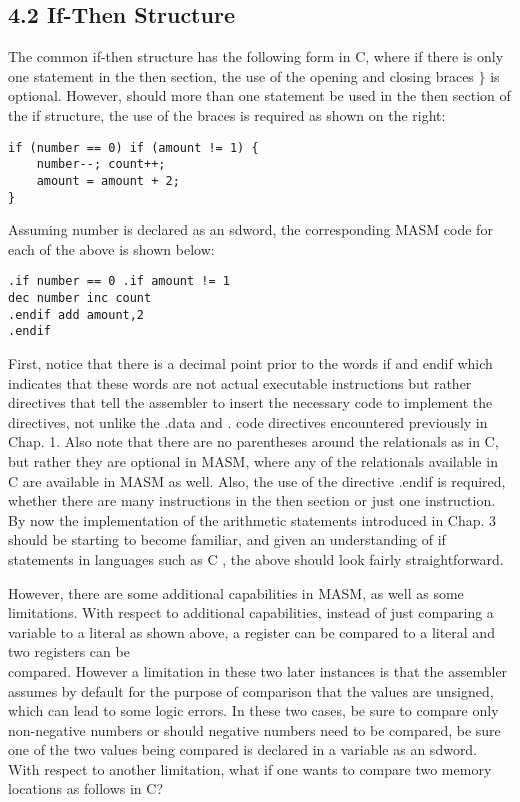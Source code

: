 \documentclass[10pt]{article}
\begin{document}
\subsection*{4.2 If-Then Structure}
The common if-then structure has the following form in C, where if there is only one statement in the then section, the use of the opening and closing braces $\}$ is optional. However, should more than one statement be used in the then section of the if structure, the use of the braces is required as shown on the right:

\begin{verbatim}
if (number == 0) if (amount != 1) {
    number--; count++;
    amount = amount + 2;
}
\end{verbatim}

Assuming number is declared as an sdword, the corresponding MASM code for each of the above is shown below:

\begin{verbatim}
.if number == 0 .if amount != 1
dec number inc count
.endif add amount,2
.endif
\end{verbatim}

First, notice that there is a decimal point prior to the words if and endif which indicates that these words are not actual executable instructions but rather directives that tell the assembler to insert the necessary code to implement the directives, not unlike the .data and . code directives encountered previously in Chap. 1. Also note that there are no parentheses around the relationals as in C, but rather they are optional in MASM, where any of the relationals available in C are available in MASM as well. Also, the use of the directive .endif is required, whether there are many instructions in the then section or just one instruction. By now the implementation of the arithmetic statements introduced in Chap. 3 should be starting to become familiar, and given an understanding of if statements in languages such as C , the above should look fairly straightforward.

However, there are some additional capabilities in MASM, as well as some limitations. With respect to additional capabilities, instead of just comparing a variable to a literal as shown above, a register can be compared to a literal and two registers can be\\
compared. However a limitation in these two later instances is that the assembler assumes by default for the purpose of comparison that the values are unsigned, which can lead to some logic errors. In these two cases, be sure to compare only non-negative numbers or should negative numbers need to be compared, be sure one of the two values being compared is declared in a variable as an sdword. With respect to another limitation, what if one wants to compare two memory locations as follows in C?
\end{document}
